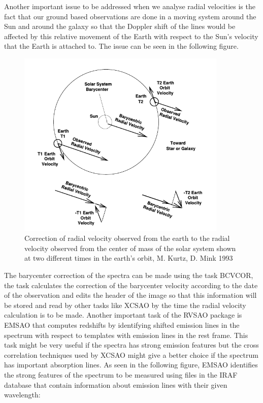 Another important issue to be addressed when we analyse radial velocities is the fact that our ground based observations are done in a moving system around the Sun and around the galaxy so that the Doppler shift of the lines would be affected by this relative movement of the Earth with respect to the Sun's velocity that the Earth is attached to. The issue can be seen in the following figure.

\begin{figure}[H]
\centering
\includegraphics[width=10cm]{images/bcvcor.png}
\caption[The nature of the barycenter shift of radial velocities]{Correction of radial velocity observed from the earth to the radial velocity observed from the center of mass of the solar system shown at two different times in the earth's orbit, M. Kurtz, D. Mink 1993 \cite{1}}
\end{figure}

The barycenter correction of the spectra can be made using the task BCVCOR, the task calculates the correction of the barycenter velocity according to the date of the observation and edits the header of the image so that this information will be stored and read by other tasks like XCSAO by the time the radial velocity calculation is to be made. Another important task of the RVSAO package is EMSAO that computes redshifts by identifying shifted emission lines in the spectrum with respect to templates with emission lines in the rest frame. This task might be very useful if the spectra has strong emission features but the cross correlation techniques used by XCSAO might give a better choice if the spectrum has important absorption lines.
As seen in the following figure, EMSAO identifies the strong features of the spectrum to be measured using files in the IRAF database that contain information about emission lines with their given wavelength:   

